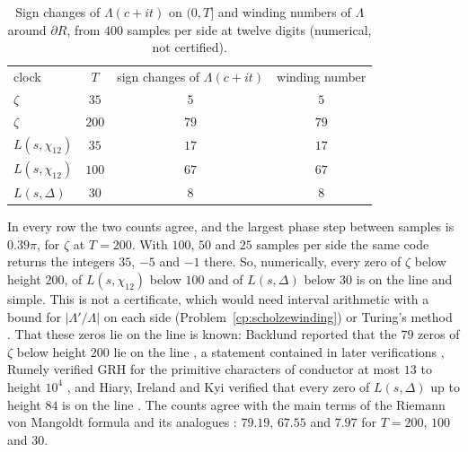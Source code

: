 \begin{table}[ht]
\centering
\caption{Sign changes of $\Lambda(c+it)$ on $(0,T]$ and winding numbers of $\Lambda$ around $\partial R$, from $400$ samples per side at twelve digits (numerical, not certified).}\label{tab:scholzewinding}
\begin{tabular}{lccc}
clock & $T$ & sign changes of $\Lambda(c+it)$ & winding number\\[2pt]
$\zeta$ & $35$ & $5$ & $5$\\
$\zeta$ & $200$ & $79$ & $79$\\
$L(s,\chi_{12})$ & $35$ & $17$ & $17$\\
$L(s,\chi_{12})$ & $100$ & $67$ & $67$\\
$L(s,\Delta)$ & $30$ & $8$ & $8$
\end{tabular}
\end{table}

In every row the two counts agree, and the largest phase step between samples is $0.39\pi$, for $\zeta$ at $T=200$. With $100$, $50$ and $25$ samples per side the same code returns the integers $35$, $-5$ and $-1$ there. So, numerically, every zero of $\zeta$ below height $200$, of $L(s,\chi_{12})$ below $100$ and of $L(s,\Delta)$ below $30$ is on the line and simple. This is not a certificate, which would need interval arithmetic with a bound for $|\Lambda'/\Lambda|$ on each side (Problem~\ref{cp:scholzewinding}) or Turing's method \cite{turing1953,booker2006}. That these zeros lie on the line is known: Backlund reported that the $79$ zeros of $\zeta$ below height $200$ lie on the line \cite{backlund1914}, a statement contained in later verifications \cite{platttrudgian2021}, Rumely verified GRH for the primitive characters of conductor at most $13$ to height $10^4$ \cite{rumely1993}, and Hiary, Ireland and Kyi verified that every zero of $L(s,\Delta)$ up to height $84$ is on the line \cite[Section~7.3]{hik2027}. The counts agree with the main terms of the Riemann von Mangoldt formula and its analogues \cite{titchmarsh1986,iwanieckowalski2004}: $79.19$, $67.55$ and $7.97$ for $T=200$, $100$ and $30$.


